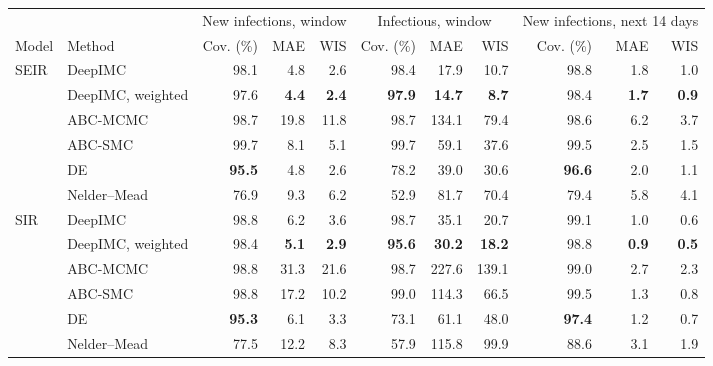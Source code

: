 \begin{tabular}{llrrrrrrrrr}
\toprule
 &  & \multicolumn{3}{c}{New infections, window} & \multicolumn{3}{c}{Infectious, window} & \multicolumn{3}{c}{New infections, next 14 days} \\
\cmidrule(lr){3-5}\cmidrule(lr){6-8}\cmidrule(lr){9-11}
Model & Method & Cov. (\%) & MAE & WIS & Cov. (\%) & MAE & WIS & Cov. (\%) & MAE & WIS \\
\midrule
SEIR & DeepIMC & 98.1 & 4.8 & 2.6 & 98.4 & 17.9 & 10.7 & 98.8 & 1.8 & 1.0 \\
 & DeepIMC, weighted & 97.6 & \textbf{4.4} & \textbf{2.4} & \textbf{97.9} & \textbf{14.7} & \textbf{8.7} & 98.4 & \textbf{1.7} & \textbf{0.9} \\
 & ABC-MCMC & 98.7 & 19.8 & 11.8 & 98.7 & 134.1 & 79.4 & 98.6 & 6.2 & 3.7 \\
 & ABC-SMC & 99.7 & 8.1 & 5.1 & 99.7 & 59.1 & 37.6 & 99.5 & 2.5 & 1.5 \\
 & DE & \textbf{95.5} & 4.8 & 2.6 & 78.2 & 39.0 & 30.6 & \textbf{96.6} & 2.0 & 1.1 \\
 & Nelder--Mead & 76.9 & 9.3 & 6.2 & 52.9 & 81.7 & 70.4 & 79.4 & 5.8 & 4.1 \\
\midrule
SIR & DeepIMC & 98.8 & 6.2 & 3.6 & 98.7 & 35.1 & 20.7 & 99.1 & 1.0 & 0.6 \\
 & DeepIMC, weighted & 98.4 & \textbf{5.1} & \textbf{2.9} & \textbf{95.6} & \textbf{30.2} & \textbf{18.2} & 98.8 & \textbf{0.9} & \textbf{0.5} \\
 & ABC-MCMC & 98.8 & 31.3 & 21.6 & 98.7 & 227.6 & 139.1 & 99.0 & 2.7 & 2.3 \\
 & ABC-SMC & 98.8 & 17.2 & 10.2 & 99.0 & 114.3 & 66.5 & 99.5 & 1.3 & 0.8 \\
 & DE & \textbf{95.3} & 6.1 & 3.3 & 73.1 & 61.1 & 48.0 & \textbf{97.4} & 1.2 & 0.7 \\
 & Nelder--Mead & 77.5 & 12.2 & 8.3 & 57.9 & 115.8 & 99.9 & 88.6 & 3.1 & 1.9 \\
\bottomrule
\end{tabular}
